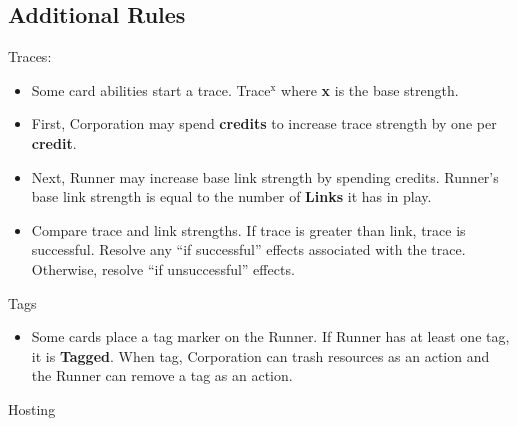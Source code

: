 \documentclass[12pt]{article}
\newenvironment{itemizeCustom}
{\begin{itemize}
  \setlength{\itemsep}{1pt}
  \setlength{\parskip}{0pt}
  \setlength{\parsep}{0pt}}
{\end{itemize}}
\begin{document}
\begin{multicols*}{2}
\section*{Additional Rules}
Traces:
\begin{itemizeCustom}
	\item Some card abilities start a trace. Trace$^{\textrm{x}}$ where \textbf{x} is the base strength.
	\item First, Corporation may spend \textbf{credits} to increase trace strength by one per \textbf{credit}.
	\item Next, Runner may increase base link strength by spending credits. Runner's base link strength is equal to the number of \textbf{Links} it has in play.
	\item Compare trace and link strengths. If trace is greater than link, trace is successful. Resolve any ``if successful'' effects associated with the trace. Otherwise, resolve ``if unsuccessful'' effects.
\end{itemizeCustom}

Tags
\begin{itemizeCustom}
	\item Some cards place a tag marker on the Runner. If Runner has at least one tag, it is \textbf{Tagged}. When tag, Corporation can trash resources as an action and the Runner can remove a tag as an action.
\end{itemizeCustom}

Hosting
\end{multicols*}
\end{document}
